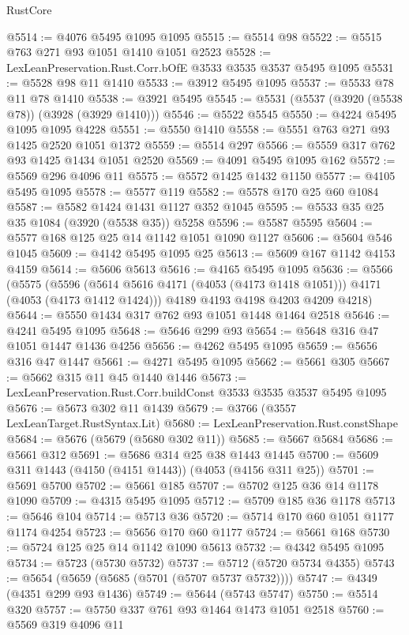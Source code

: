 \begin{lexlean}{RustCore}
\begin{coremodule}
@5514 := @4076 @5495 @1095 @1095
@5515 := @5514 @98
@5522 := @5515 @763 @271 @93 @1051 @1410 @1051 @2523
@5528 := LexLeanPreservation.Rust.Corr.bOfE @3533 @3535 @3537 @5495 @1095
@5531 := @5528 @98 @11 @1410
@5533 := @3912 @5495 @1095
@5537 := @5533 @78 @11 @78 @1410
@5538 := @3921 @5495
@5545 := @5531 (@5537 (@3920 (@5538 @78)) (@3928 (@3929 @1410)))
@5546 := @5522 @5545
@5550 := @4224 @5495 @1095 @1095 @4228
@5551 := @5550 @1410
@5558 := @5551 @763 @271 @93 @1425 @2520 @1051 @1372
@5559 := @5514 @297
@5566 := @5559 @317 @762 @93 @1425 @1434 @1051 @2520
@5569 := @4091 @5495 @1095 @162
@5572 := @5569 @296 @4096 @11
@5575 := @5572 @1425 @1432 @1150
@5577 := @4105 @5495 @1095
@5578 := @5577 @119
@5582 := @5578 @170 @25 @60 @1084
@5587 := @5582 @1424 @1431 @1127 @352 @1045
@5595 := @5533 @35 @25 @35 @1084 (@3920 (@5538 @35)) @5258
@5596 := @5587 @5595
@5604 := @5577 @168 @125 @25 @14 @1142 @1051 @1090 @1127
@5606 := @5604 @546 @1045
@5609 := @4142 @5495 @1095 @25
@5613 := @5609 @167 @1142 @4153 @4159
@5614 := @5606 @5613
@5616 := @4165 @5495 @1095
@5636 := @5566
    (@5575
      (@5596 (@5614 @5616 @4171 (@4053 (@4173 @1418 @1051))) @4171 (@4053 (@4173 @1412 @1424)))
      @4189
      @4193
      @4198
      @4203
      @4209
      @4218)
@5644 := @5550 @1434 @317 @762 @93 @1051 @1448 @1464 @2518
@5646 := @4241 @5495 @1095
@5648 := @5646 @299 @93
@5654 := @5648 @316 @47 @1051 @1447 @1436 @4256
@5656 := @4262 @5495 @1095
@5659 := @5656 @316 @47 @1447
@5661 := @4271 @5495 @1095
@5662 := @5661 @305
@5667 := @5662 @315 @11 @45 @1440 @1446
@5673 := LexLeanPreservation.Rust.Corr.buildConst @3533 @3535 @3537 @5495 @1095
@5676 := @5673 @302 @11 @1439
@5679 := @3766 (@3557 LexLeanTarget.RustSyntax.Lit)
@5680 := LexLeanPreservation.Rust.constShape
@5684 := @5676 (@5679 (@5680 @302 @11))
@5685 := @5667 @5684
@5686 := @5661 @312
@5691 := @5686 @314 @25 @38 @1443 @1445
@5700 := @5609 @311 @1443 (@4150 (@4151 @1443)) (@4053 (@4156 @311 @25))
@5701 := @5691 @5700
@5702 := @5661 @185
@5707 := @5702 @125 @36 @14 @1178 @1090
@5709 := @4315 @5495 @1095
@5712 := @5709 @185 @36 @1178
@5713 := @5646 @104
@5714 := @5713 @36
@5720 := @5714 @170 @60 @1051 @1177 @1174 @4254
@5723 := @5656 @170 @60 @1177
@5724 := @5661 @168
@5730 := @5724 @125 @25 @14 @1142 @1090 @5613
@5732 := @4342 @5495 @1095
@5734 := @5723 (@5730 @5732)
@5737 := @5712 (@5720 @5734 @4355)
@5743 := @5654 (@5659 (@5685 (@5701 (@5707 @5737 @5732))))
@5747 := @4349 (@4351 @299 @93 @1436)
@5749 := @5644 (@5743 @5747)
@5750 := @5514 @320
@5757 := @5750 @337 @761 @93 @1464 @1473 @1051 @2518
@5760 := @5569 @319 @4096 @11

\end{coremodule}
\end{lexlean}
